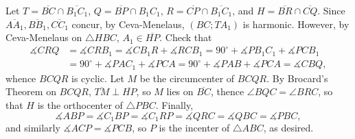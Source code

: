 Let $T=\overline{BC}\cap\overline{B_1C_1}$, $Q=\overline{BP}\cap{B_1C_1}$, $R=\overline{CP}\cap\overline{B_1C_1}$, and $H=\overline{BR}\cap\overline{CQ}$. Since $\overline{AA_1},\overline{BB_1},\overline{CC_1}$ concur, by Ceva-Menelaus, $(BC;TA_1)$ is harmonic. However, by Ceva-Menelaus on $\triangle HBC$, $A_1\in\overline{HP}$. Check that
\begin{align*}
    \measuredangle CRQ&=\measuredangle CRB_1=\measuredangle CB_1R+\measuredangle RCB_1=90^\circ+\measuredangle PB_1C_1+\measuredangle PCB_1\\
    &=90^\circ+\measuredangle PAC_1+\measuredangle PCA=90^\circ+\measuredangle PAB+\measuredangle PCA=\measuredangle CBQ,
\end{align*}
whence $BCQR$ is cyclic. Let $M$ be the circumcenter of $BCQR$. By Brocard's Theorem on $BCQR$, $\overline{TM}\perp\overline{HP}$, so $M$ lies on $\overline{BC}$, thence $\angle BQC=\angle BRC$, so that $H$ is the orthocenter of $\triangle PBC$. Finally, \[\measuredangle ABP=\measuredangle C_1BP=\measuredangle C_1RP=\measuredangle QRC=\measuredangle QBC=\measuredangle PBC,\]
and similarly $\measuredangle ACP=\measuredangle PCB$, so $P$ is the incenter of $\triangle ABC$, as desired. 

